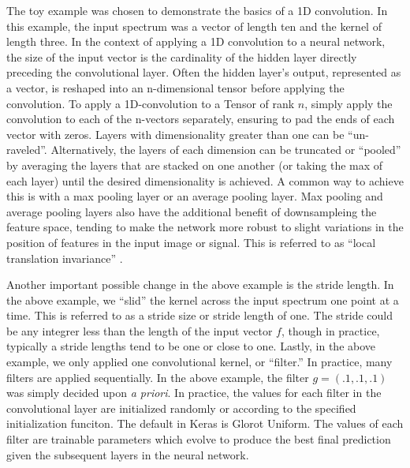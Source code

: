 The toy example was chosen to demonstrate the basics of a 1D convolution. In this example, the input spectrum was a vector of length ten and the kernel of length three. In the context of applying a 1D convolution to a neural network, the size of the input vector is the cardinality of the hidden layer directly preceding the convolutional layer. Often the hidden layer's output, represented as a vector, is reshaped into an n-dimensional tensor before applying the convolution. To apply a 1D-convolution to a Tensor of rank $ n $, simply apply the convolution to each of the n-vectors separately, ensuring to pad the ends of each vector with zeros. Layers with dimensionality greater than one can be ``un-raveled''. Alternatively, the layers of each dimension can be truncated or ``pooled'' by averaging the layers that are stacked on one another (or taking the max of each layer) until the desired dimensionality is achieved. A common way to achieve this is with a max pooling layer or an average pooling layer. Max pooling and average pooling layers also have the additional benefit of downsampleing the feature space, tending to make the network more robust to slight variations in the position of features in the input image or signal. This is referred to as ``local translation invariance'' \cite{local-translation-invariance}.

Another important possible change in the above example is the stride length. In the above example, we ``slid'' the kernel across the input spectrum one point at a time. This is referred to as a stride size or stride length of one. The stride could be any integrer less than the length of the input vector $ f $, though in practice, typically a stride lengths tend to be one or close to one. Lastly, in the above example, we only applied one convolutional kernel, or ``filter.'' In practice, many filters are applied sequentially. In the above example, the filter $ g = (.1, .1, .1) $ was simply decided upon \textit{a priori}. In practice, the values for each filter in the convolutional layer are initialized randomly or according to the specified initialization funciton. The default in Keras is Glorot Uniform. The values of each filter are trainable parameters which evolve to produce the best final prediction given the subsequent layers in the neural network.


